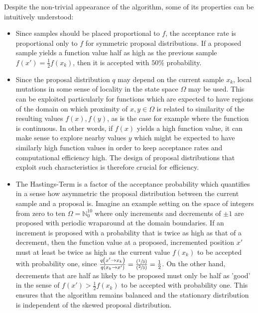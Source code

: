 \documentclass[oneside, a4paper]{article}
\newcommand\br[1]{\left(#1\right)}
\begin{document}
Despite the non-trivial appearance of the algorithm, some of its properties can be intuitively understood:
\begin{itemize}
  \item Since samples should be placed proportional to $f$, the acceptance rate is proportional only to $f$ for symmetric proposal distributions. If a proposed sample yields a function value half as high as the previous sample $f(x') = \frac{1}{2}f(x_k)$, then it is accepted with $50\%$ probability.
  \item Since the proposal distribution $q$ may depend on the current sample $x_k$, local mutations in some sense of locality in the state space $\Omega$ may be used. This can be exploited particularly for functions which are expected to have regions of the domain on which proximity of $x,y \in \Omega$ is related to similarity of the resulting values $f(x), f(y)$, as is the case for example where the function is continuous. In other words, if $f(x)$ yields a high function value, it can make sense to explore nearby values $y$ which might be expected to have similarly high function values in order to keep acceptance rates and computational efficiency high. The design of proposal distributions that exploit such characteristics is therefore crucial for efficiency.
  \item The Hastings-Term is a factor of the acceptance probability which quantifies in a sense how asymmetric the proposal distribution between the current sample and a proposal is. Imagine an example setting on the space of integers from zero to ten $\Omega = \mathds{N}_0^{10}$ where only increments and decrements of $\pm 1$ are proposed with periodic wraparound at the domain boundaries. If an increment is proposed with a probability that is twice as high as that of a decrement, then the function value at a proposed, incremented position $x'$ must at least be twice as high as the current value $f(x_k)$ to be accepted with probability one, since $\frac{q\br{x'\to x_k}}{q\br{x_k \to x'}} = \frac{\br{\sfrac{1}{3}}}{\br{\sfrac{2}{3}}} = \frac{1}{2}$. On the other hand, decrements that are half as likely to be proposed must only be half as 'good'  in the sense of $f(x')>\frac{1}{2}f(x_k)$ to be accepted with probability one. This ensures that the algorithm remains balanced and the stationary distribution is independent of the skewed proposal distribution.
\end{itemize}
\end{document}
